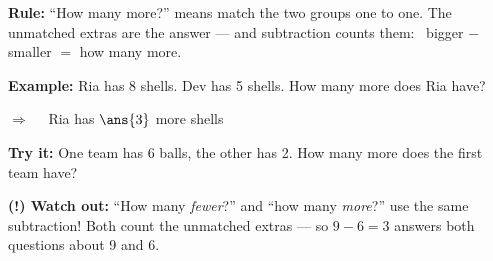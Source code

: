 \documentclass[12pt]{article}
\begin{document}

\begin{formulabox}
\textbf{Rule:} ``How many more?'' means match the two groups one to one.
The unmatched extras are the answer --- and subtraction counts them:
\ bigger $-$ smaller $=$ how many more.
\end{formulabox}

\begin{examplebox}
\textbf{Example:} \quad Ria has 8 shells. Dev has 5 shells. How many more
does Ria have?

$\Rightarrow\quad$ Ria has $\ans{3}$ more shells
\end{examplebox}

\begin{tryitbox}
\textbf{Try it:} \quad One team has 6 balls, the other has 2. How many more
does the first team have?\\[2pt]
\end{tryitbox}

\begin{watchoutbox}
\textbf{(!) Watch out:} ``How many \emph{fewer}?'' and ``how many
\emph{more}?'' use the same subtraction! Both count the unmatched extras ---
so $9-6=3$ answers both questions about 9 and 6.
\end{watchoutbox}
\end{document}
